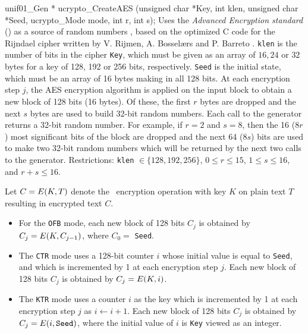 unif01_Gen * ucrypto_CreateAES (unsigned char *Key, int klen,
                                unsigned char *Seed, ucrypto_Mode mode,
                                int r, int s);
\endcode
\tab Uses the \textit{Advanced Encryption standard} (\aes) as a source of
%
  random numbers \cite{rDAE02a,rNIS01a,rHEL03a,rBAR06a}, based on the optimized
  C code for the Rijndael cipher written by V. Rijmen,
  A. Bossel\ae rs and P. Barreto \cite{rRIJ00a}. \texttt{klen} is the number of
  bits in the cipher \texttt{Key}, which must be given as an array of $16, 24$
  or $32$ bytes for a key of 128, 192 or 256 bits, respectively. \texttt{Seed}
  is the initial state, which must be an array of 16 bytes making in all 128 bits.
  At each encryption step $j$, the AES encryption algorithm is applied on the
  input block to obtain a new block of 128 bits (16 bytes). Of these,
  the first $r$ bytes are dropped and the next $s$ bytes are used to build 32-bit
  random numbers. Each call to the generator returns a 32-bit random number.
  For example, if $r=2$ and $s=8$, then the 16 ($8r$) most significant bits of
  the block are dropped and the next 64 ($8s$) bits are used to make two 32-bit
  random numbers which will be returned by the next two calls to the
  generator. Restrictions: \texttt{klen} $\in \{ 128, 192, 256\}$,
  $0 \le r \le 15$, $1 \le s \le 16$, and  $r + s \le 16$.

  Let $C = {E}(K,T)$ denote the \aes\ encryption operation with key $K$ on
  plain text $T$ resulting in encrypted text $C$.
\begin{itemize}

\item  For the \texttt{OFB} mode, each new block of 128 bits $C_j$ is
  obtained by $C_j = {E}(K,C_{j-1})$, where $C_0 =$ \texttt{Seed}. 

\item The \texttt{CTR} mode uses a 128-bit counter $i$ whose initial value is
  equal to \texttt{Seed}, and which is incremented
  by 1 at each encryption step $j$. Each new block of 128 bits
  $C_j$ is obtained by $C_j = {E}(K,i)$.

\item The \texttt{KTR} mode uses a counter $i$ as the key which is
  incremented by 1 at each encryption step $j$ as $i \leftarrow i + 1$. 
  Each new block of 128 bits $C_j$ is obtained by
  $C_j = {E}(i, \texttt{Seed})$, where the initial value of $i$ is
 \texttt{Key} viewed as an integer.
\end{itemize}
 \endtab
\code


